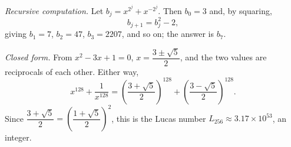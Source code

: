 \emph{Recursive computation.} Let $b_j=x^{2^j}+x^{-2^j}$. Then $b_0=3$ and, by squaring,
\[b_{j+1}=b_j^2-2,\]
giving $b_1=7$, $b_2=47$, $b_3=2207$, and so on; the answer is $b_7$.

\emph{Closed form.} From $x^2-3x+1=0$, $x=\dfrac{3\pm\sqrt5}{2}$, and the two values are reciprocals of each other. Either way,
\[x^{128}+\dfrac1{x^{128}}=\boxed{\left(\dfrac{3+\sqrt5}{2}\right)^{128}+\left(\dfrac{3-\sqrt5}{2}\right)^{128}}.\]
Since $\dfrac{3+\sqrt5}{2}=\left(\dfrac{1+\sqrt5}{2}\right)^2$, this is the Lucas number $L_{256}\approx3.17\times10^{53}$, an integer.
